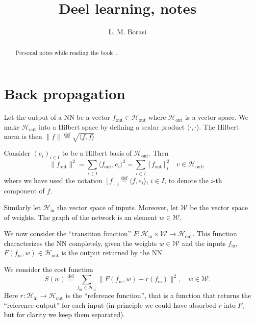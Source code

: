 \documentclass[10pt, a4paper]{article}
\title{Deel learning, notes}
\author{L. M. Borasi}
\theoremstyle{plain}
\theoremstyle{definition}
\theoremstyle{definition}
\theoremstyle{definition}
\theoremstyle{definition}
\theoremstyle{definition}
\theoremstyle{definition}
\theoremstyle{definition}
\theoremstyle{remark}
\theoremstyle{remark}
\theoremstyle{rudin-style-generic}
\theoremstyle{rudin-style-generic*}
\theoremstyle{rudin-style-theorem}
\newcommand{\deq}{\stackrel{\mathrm{def}}{=}}
\begin{document}
\maketitle
\begin{abstract}
	Personal notes while reading the book~\cite{goodfellowDeepLearning2016}.
\end{abstract}
\tableofcontents

\section{Back propagation}

Let the output of a NN be a vector $f_{\text{out}}\in \mathcal H_{\text{out}}$ 
where $\mathcal H_{\text{out}}$ is a vector space.
We make $\mathcal H_{\text{out}}$ into a Hilbert space by defining a scalar product $\langle\cdot,\cdot\rangle$.
The Hilbert norm is then $\|f\|\deq \sqrt{\langle f,f\rangle}$ 


Consider $(e_i)_{i\in I}$ to be a Hilbert basis of $\mathcal H_{\text{out}}$.
Then
\begin{equation*}
	\| f_{\text{out}} \|^2 = \sum_{i\in I} \langle f_{\text{out}}, e_i \rangle^2 = \sum_{i\in I}  [f_{\text{out}}]_i^2 
	\quad v\in\mathcal H_{\text{out}}
	,
\end{equation*}
where we have used the notation $[f]_i \deq \langle f, e_i\rangle$, $i\in I$, to denote the $i$-th component of $f$.



Similarly let $\mathcal H_{\text{in}}$ the vector space of inputs.
Moreover, let $\mathcal W$ be the vector space of weights. The graph of the network is an element $w\in\mathcal W$.

We now consider the ``transition function'' $F:\mathcal H_{\text{in}} \times \mathcal W \rightarrow \mathcal H_{\text{out}}$.
This function characterizes the NN completely, given the weights $w\in\mathcal W$ and the inputs $f_{\text{in}}$,
$F(f_{\text{in}}, w)\in\mathcal H_{\text{out}}$ is the output returned by the NN.

We consider the cost function
\begin{equation*}
	S(w) \deq \sum_{f_{\text{in}}\in\mathcal H_{\text{in}}} \| F(f_{\text{in}}, w) - r(f_{\text{in}}) \|^2,
	\quad w\in\mathcal W
	.
\end{equation*}
Here $r:\mathcal H_{\text{in}}\rightarrow\mathcal H_{\text{out}}$ is the ``reference function'',
that is a function that returns the ``reference output'' for each input (in principle we could have absorbed $r$ into $F$,
but for clarity we keep them separated).
\end{document}
